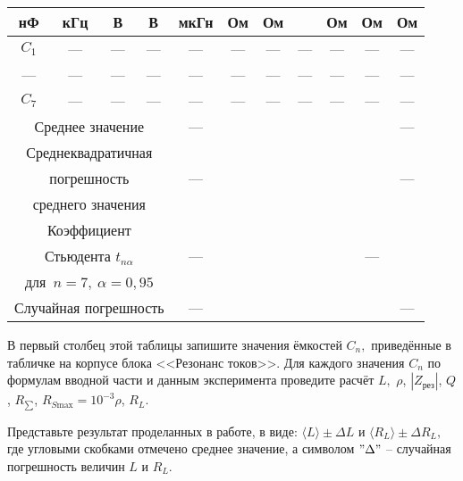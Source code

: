\begin{lab:task}
\begin{enumerate}
\begin{center}
\begin{table}[h!]
\begin{center}
\begin{tabular}{|c|c|c|c|c|c|c|c|c|c|c|}
	                нФ & кГц & В & В & мкГн & Ом & Ом &  & Ом & Ом & Ом \\
	                \hline
	                $C_1$ & {---} & --- & --- & --- & --- & --- & --- & --- & --- & --- \\
	                \hline
	                --- & --- & --- & --- & --- & --- & --- & --- & --- & ---& ---\\
	                \hline
	                $C_7$& --- & --- & --- & --- & --- & --- & ---& --- &--- &---\\
	                \hline
	                \multicolumn{4}{|c|}{ Среднее значение} & --- & & & & & &--- \\
	                \hline
	                \multicolumn{4}{|c|}{ Среднеквадратичная } & & & & & & & \\
	                \multicolumn{4}{|c|}{ погрешность } & ---& & & & & &--- \\
	                \multicolumn{4}{|c|}{ среднего значения } &  & & & & && \\
	                \hline
	                \multicolumn{4}{|c|}{ Коэффициент } & & & & & & & \\
	                \multicolumn{4}{|c|}{ Стьюдента $t_{n\alpha}$ } & ---& & & & &---& \\
	                \multicolumn{4}{|c|}{для~$n=7,~\alpha=0,95$} &  & & & & && \\
			                    \hline
	                \multicolumn{4}{|c|}{ Случайная погрешность } & ---& & & & & &---\\

	                \hline
	            \end{tabular}
	        \end{center}
	    \end{table}
	\end{center}
В первый столбец этой таблицы запишите значения ёмкостей $C_n,$ приведённые в табличке на корпусе блока <<Резонанс токов>>. Для каждого значения $C_n$ по формулам вводной части и данным эксперимента проведите  расчёт $L,$ $\rho$, $|Z_{\text{рез}}|$, $Q$, $R_{\scriptstyle \sum}$, $R_{S \text{max}}=10^{-3}\rho$, $R_L$.

Представьте результат  проделанных в работе, в виде: $\langle L \rangle\pm\Delta L$ и $\langle R_L\rangle\pm\Delta R_L,$ где угловыми скобками отмечено среднее значение, а символом $"\Delta"$ – случайная погрешность величин $L$ и $R_L.$


\end{enumerate}
\end{lab:task}
